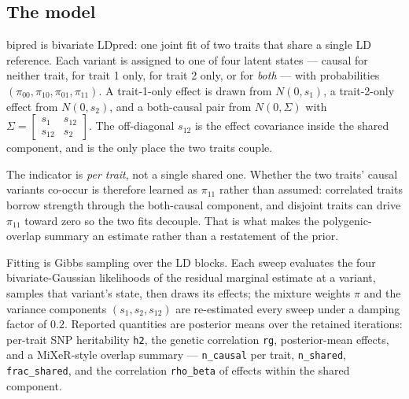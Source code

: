 %

\subsection*{The model}

bipred is bivariate LDpred: one joint fit of two traits that share a single LD
reference. Each variant is assigned to one of four latent states --- causal for
neither trait, for trait 1 only, for trait 2 only, or for \emph{both} --- with
probabilities $(\pi_{00}, \pi_{10}, \pi_{01}, \pi_{11})$. A trait-1-only effect
is drawn from $N(0, s_1)$, a trait-2-only effect from $N(0, s_2)$, and a
both-causal pair from $N(0, \Sigma)$ with
$\Sigma = \left[\begin{smallmatrix} s_1 & s_{12} \\ s_{12} & s_2
\end{smallmatrix}\right]$. The off-diagonal $s_{12}$ is the effect covariance
inside the shared component, and is the only place the two traits couple.

The indicator is \emph{per trait}, not a single shared one. Whether the two
traits' causal variants co-occur is therefore learned as $\pi_{11}$ rather than
assumed: correlated traits borrow strength through the both-causal component,
and disjoint traits can drive $\pi_{11}$ toward zero so the two fits decouple.
That is what makes the polygenic-overlap summary an estimate rather than a
restatement of the prior.

Fitting is Gibbs sampling over the LD blocks. Each sweep evaluates the four
bivariate-Gaussian likelihoods of the residual marginal estimate at a variant,
samples that variant's state, then draws its effects; the mixture weights $\pi$
and the variance components $(s_1, s_2, s_{12})$ are re-estimated every sweep
under a damping factor of $0.2$. Reported quantities are posterior means over
the retained iterations: per-trait SNP heritability \texttt{h2}, the genetic
correlation \texttt{rg}, posterior-mean effects, and a MiXeR-style overlap
summary --- \texttt{n\_causal} per trait, \texttt{n\_shared},
\texttt{frac\_shared}, and the correlation \texttt{rho\_beta} of effects within
the shared component.

